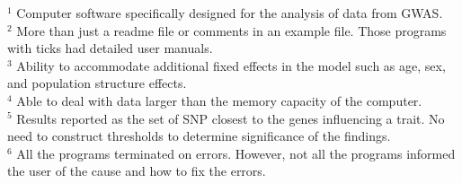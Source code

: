 \documentclass[10pt]{article}
\begin{document}
\begin{table}
\begin{tabular}{lccccccccc}
\end{tabular}
{$^1$ \scriptsize{Computer software specifically designed for the analysis of data from GWAS.}}\\
{$^2$ \scriptsize{More than just a readme file or comments in an example file. Those programs with ticks had detailed user manuals.}}\\
{$^3$ \scriptsize{Ability to accommodate additional fixed effects in the model such as age, sex, and population structure effects.}} \\
{$^4$ \scriptsize{Able to deal with data larger than the memory capacity of the computer.}} \\
{$^5$ \scriptsize{Results reported as the set of SNP closest to the genes influencing a trait. No need to construct thresholds to determine 
significance of the findings.}}\\
{$^6$  \scriptsize{All the programs terminated on errors. However, not all the programs informed the user of the cause and how to fix the errors.}}\\
\end{table}
\end{document}
